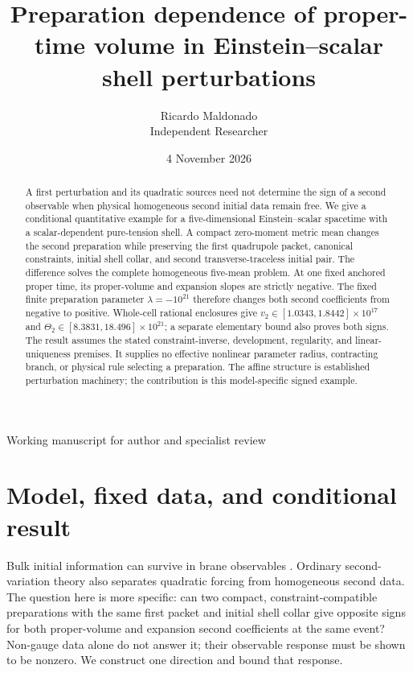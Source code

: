 \documentclass[11pt]{article}
\title{Preparation dependence of proper-time volume in Einstein--scalar shell perturbations}
\author{Ricardo Maldonado\\\small Independent Researcher}
\date{4 November 2026}
\begin{document}
\maketitle
\begin{center}\small Working manuscript for author and specialist review\end{center}
\begin{abstract}
A first perturbation and its quadratic sources need not determine the sign
of a second observable when physical homogeneous second initial data remain
free. We give a conditional quantitative example for a five-dimensional
Einstein--scalar spacetime with a scalar-dependent pure-tension shell.
A compact zero-moment metric mean changes the second preparation while
preserving the first quadrupole packet, canonical constraints, initial shell
collar, and second transverse-traceless initial pair. The difference solves
the complete homogeneous five-mean problem. At one fixed anchored proper
time, its proper-volume and expansion slopes are strictly negative.
The fixed finite preparation parameter $\lambda=-10^{21}$ therefore changes
both second coefficients from negative to positive. Whole-cell rational
enclosures give $v_2\in[1.0343,1.8442]\times10^{17}$ and
$\Theta_2\in[8.3831,18.496]\times10^{21}$; a separate elementary bound
also proves both signs. The result assumes the stated constraint-inverse,
development, regularity, and linear-uniqueness premises. It supplies no
effective nonlinear parameter radius, contracting branch, or physical rule
selecting a preparation. The affine structure is established perturbation
machinery; the contribution is this model-specific signed example.
\end{abstract}

\section{Model, fixed data, and conditional result}

Bulk initial information can survive in brane observables
\cite{Minamitsuji,Deffayet,Hiramatsu}. Ordinary second-variation theory
also separates quadratic forcing from homogeneous second data. The question
here is more specific: can two compact, constraint-compatible preparations
with the same first packet and initial shell collar give opposite signs
for both proper-volume and expansion second coefficients at the same event?
Non-gauge data alone do not answer it; their observable response must be
shown to be nonzero. We construct one direction and bound that response.
\end{document}
